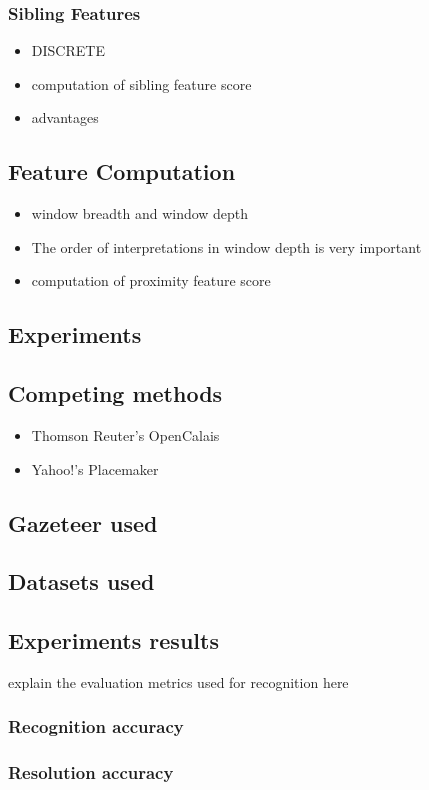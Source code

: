 \documentclass[
     11pt,         %
     a4paper,      %
     oneside,
     ]{article}
\begin{document}
\subsubsection{Sibling Features}
\begin{itemize}
	\item DISCRETE
	\item computation of sibling feature score
	\item advantages
\end{itemize}
\subsection{Feature Computation}
\begin{itemize}
	\item window breadth and window depth
	\item The order of interpretations in window depth is very important
	\item computation of proximity feature score
\end{itemize}

\subsection{Experiments}
\subsection{Competing methods}
\begin{itemize}
	\item Thomson Reuter's OpenCalais
	\item Yahoo!'s Placemaker
\end{itemize}
\subsection{Gazeteer used}
\subsection{Datasets used}
\subsection{Experiments results}
explain the evaluation metrics used for recognition here
\subsubsection{Recognition accuracy}
\subsubsection{Resolution accuracy}
\end{document}
